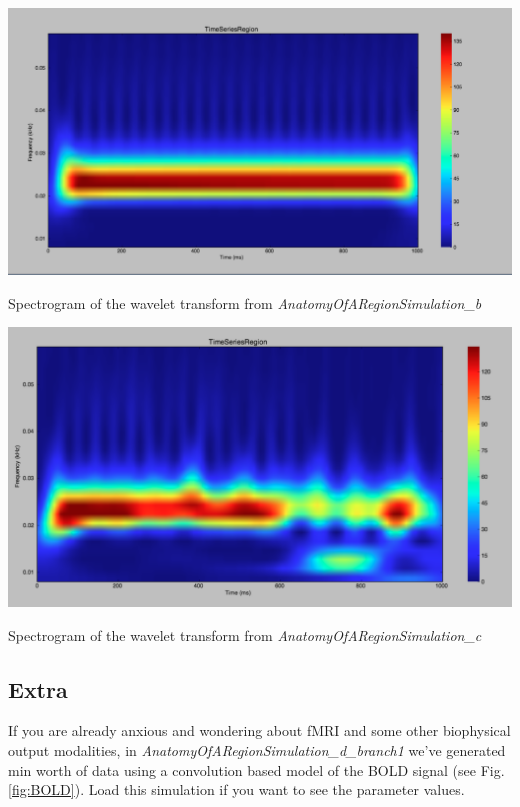 \documentclass{tufte-handout}
\begin{document}
\begin{marginfigure}%
\includegraphics[width=\linewidth]{Handout_UI_BuildingYourOwnBrainNetworkModel_WaveletDeterministic}%
  \caption{Spectrogram of the wavelet transform from \textit{AnatomyOfARegionSimulation\_b}}%
  \label{fig:wavelet_deteministic}%
\end{marginfigure}
%
\begin{marginfigure}%
\includegraphics[width=\linewidth]{Handout_UI_BuildingYourOwnBrainNetworkModel_WaveletStochastic}%
  \caption{Spectrogram of the wavelet transform from \textit{AnatomyOfARegionSimulation\_c}}%
  \label{fig:wavelet_stochastic}%
\end{marginfigure}


\subsection{Extra}\label{sec:results}

If you are already anxious and wondering about fMRI and some other biophysical output modalities, in \textit{AnatomyOfARegionSimulation\_d\_branch1} we've generated \unit[4]{min} worth of data using a convolution based model of the BOLD signal (see Fig. \ref{fig:BOLD}). Load this simulation if you want to see the parameter values.
\end{document}
